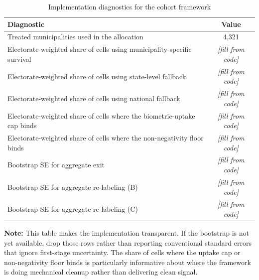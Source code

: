 \begin{table}[!htbp]
\centering
\caption{Implementation diagnostics for the cohort framework}
\label{tab:decomp_diagnostics}
\begin{tabular}{lc}
\toprule
Diagnostic & Value \\
\midrule
Treated municipalities used in the allocation & 4{,}321 \\
Electorate-weighted share of cells using municipality-specific survival & \textit{[fill from code]} \\
Electorate-weighted share of cells using state-level fallback & \textit{[fill from code]} \\
Electorate-weighted share of cells using national fallback & \textit{[fill from code]} \\
Electorate-weighted share of cells where the biometric-uptake cap binds & \textit{[fill from code]} \\
Electorate-weighted share of cells where the non-negativity floor binds & \textit{[fill from code]} \\
Bootstrap SE for aggregate exit & \textit{[fill from code]} \\
Bootstrap SE for aggregate re-labeling (B) & \textit{[fill from code]} \\
Bootstrap SE for aggregate re-labeling (C) & \textit{[fill from code]} \\
\bottomrule
\end{tabular}

\vspace{0.75em}
\begin{minipage}{\textwidth}
{\footnotesize \textbf{Note:} This table makes the implementation transparent. If the bootstrap is not yet available, drop those rows rather than reporting conventional standard errors that ignore first-stage uncertainty. The share of cells where the uptake cap or non-negativity floor binds is particularly informative about where the framework is doing mechanical cleanup rather than delivering clean signal. \par}
\end{minipage}
\end{table}
